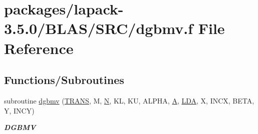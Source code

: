 \hypertarget{lapack-3_85_80_2BLAS_2SRC_2dgbmv_8f}{}\section{packages/lapack-\/3.5.0/\+B\+L\+A\+S/\+S\+R\+C/dgbmv.f File Reference}
\label{lapack-3_85_80_2BLAS_2SRC_2dgbmv_8f}
\subsection*{Functions/\+Subroutines}
\begin{DoxyCompactItemize}
\item 
subroutine \hyperlink{group__double__blas__level2_ga0dc187c15a47772440defe879d034888}{dgbmv} (\hyperlink{superlu__enum__consts_8h_a0c4e17b2d5cea33f9991ccc6a6678d62a1f61e3015bfe0f0c2c3fda4c5a0cdf58}{T\+R\+A\+N\+S}, M, \hyperlink{polmisc_8c_a0240ac851181b84ac374872dc5434ee4}{N}, K\+L, K\+U, A\+L\+P\+H\+A, \hyperlink{classA}{A}, \hyperlink{example__user_8c_ae946da542ce0db94dced19b2ecefd1aa}{L\+D\+A}, X, I\+N\+C\+X, B\+E\+T\+A, Y, I\+N\+C\+Y)
\begin{DoxyCompactList}\small\item\em {\bfseries D\+G\+B\+M\+V} \end{DoxyCompactList}\end{DoxyCompactItemize}
